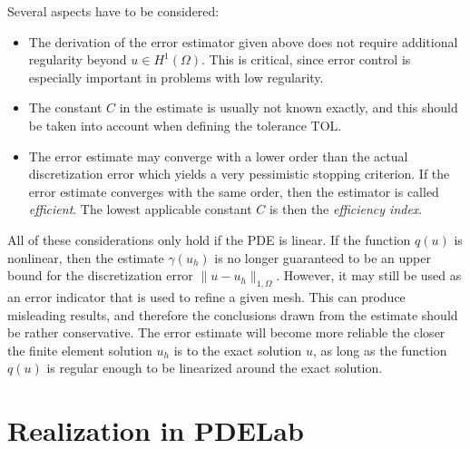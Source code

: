 \documentclass[a4paper,12pt]{article}
\begin{document}
Several aspects have to be considered:
\begin{itemize}
  \item The derivation of the error estimator given above does not require additional regularity
    beyond $u \in H^1(\Omega)$. This is critical, since error control is especially important
    in problems with low regularity.
  \item The constant $C$ in the estimate is usually not known exactly, and this should be taken
    into account when defining the tolerance $\text{TOL}$.
  \item The error estimate may converge with a lower order than the actual discretization error
    which yields a very pessimistic stopping criterion. If the error estimate converges with the
    same order, then the estimator is called \emph{efficient}. The lowest applicable constant $C$
    is then the \emph{efficiency index}.
\end{itemize}

All of these considerations only hold if the PDE is linear. If the function $q(u)$ is nonlinear,
then the estimate $\gamma(u_h)$ is no longer guaranteed to be an upper bound for the discretization
error $\|u-u_h\|_{1,\Omega}$. However, it may still be used as an error indicator that is used to
refine a given mesh. This can produce misleading results, and therefore the conclusions drawn from
the estimate should be rather conservative. The error estimate will become more reliable the closer
the finite element solution $u_h$ is to the exact solution $u$, as long as the function $q(u)$ is
regular enough to be linearized around the exact solution.

\section{Realization in PDELab}
\end{document}
